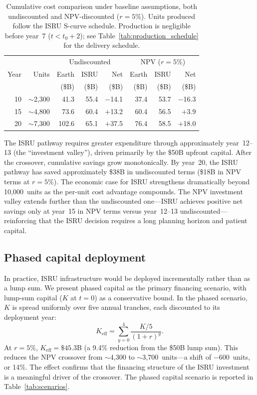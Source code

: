 \documentclass[preprint,12pt]{elsarticle}
\begin{document}
\begin{table}[htbp]
\centering
\caption{Cumulative cost comparison under baseline assumptions, both undiscounted and NPV-discounted ($r = 5\%$). Units produced follow the ISRU S-curve schedule. Production is negligible before year~7 ($t < t_0 + 2$); see Table~\ref{tab:production_schedule} for the delivery schedule.}
\label{tab:cumulative}
\begin{tabular}{@{}rr|rrr|rrr@{}}
\toprule
 & & \multicolumn{3}{c|}{Undiscounted} & \multicolumn{3}{c}{NPV ($r = 5\%$)} \\
Year & Units & Earth & ISRU & Net & Earth & ISRU & Net \\
 & & (\$B) & (\$B) & (\$B) & (\$B) & (\$B) & (\$B) \\
\midrule
10 & $\sim$2{,}300 & 41.3  & 55.4   & $-$14.1 & 37.4  & 53.7  & $-$16.3 \\
15 & $\sim$4{,}800 & 73.6  & 60.4   & $+$13.2 & 60.4  & 56.5  & $+$3.9  \\
20 & $\sim$7{,}300 & 102.6 & 65.1   & $+$37.5 & 76.4  & 58.5  & $+$18.0 \\
\bottomrule
\end{tabular}
\end{table}

The ISRU pathway requires greater expenditure through approximately year~12--13 (the ``investment valley''), driven primarily by the \$50B upfront capital. After the crossover, cumulative savings grow monotonically. By year~20, the ISRU pathway has saved approximately \$38B in undiscounted terms (\$18B in NPV terms at $r = 5\%$). The economic case for ISRU strengthens dramatically beyond 10{,}000~units as the per-unit cost advantage compounds. The NPV investment valley extends further than the undiscounted one---ISRU achieves positive net savings only at year~15 in NPV terms versus year~12--13 undiscounted---reinforcing that the ISRU decision requires a long planning horizon and patient capital.

\subsection{Phased capital deployment}
\label{sec:phased_capital}

In practice, ISRU infrastructure would be deployed incrementally rather than as a lump sum. We present phased capital as the primary financing scenario, with lump-sum capital ($K$ at $t = 0$) as a conservative bound. In the phased scenario, $K$ is spread uniformly over five annual tranches, each discounted to its deployment year:
\begin{equation}
  K_{\mathrm{eff}} = \sum_{y=0}^{4} \frac{K/5}{(1+r)^y}.
  \label{eq:phased_capital}
\end{equation}
At $r = 5\%$, $K_{\mathrm{eff}} = \$45.3$B (a 9.4\% reduction from the \$50B lump sum). This reduces the NPV crossover from $\sim$4{,}300 to $\sim$3{,}700~units---a shift of $-$600~units, or 14\%. The effect confirms that the financing structure of the ISRU investment is a meaningful driver of the crossover. The phased capital scenario is reported in Table~\ref{tab:scenarios}.
\end{document}
